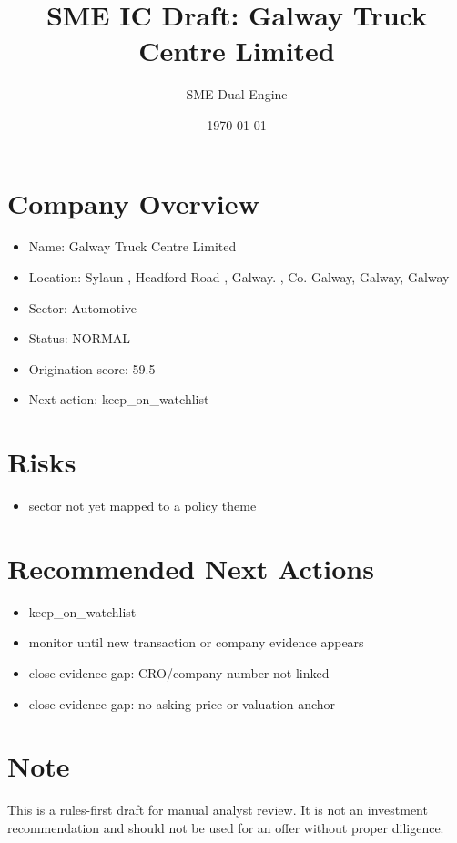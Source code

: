 \documentclass[11pt,a4paper]{article}
\title{SME IC Draft: Galway Truck Centre Limited}
\author{SME Dual Engine}
\date{\today}
\begin{document}
\maketitle
\section*{Company Overview}
\begin{itemize}[leftmargin=1.4em]
\item Name: Galway Truck Centre Limited
\item Location: Sylaun , Headford Road , Galway. , Co. Galway, Galway, Galway
\item Sector: Automotive
\item Status: NORMAL
\item Origination score: 59.5
\item Next action: keep\_on\_watchlist
\end{itemize}
\section*{Risks}
\begin{itemize}[leftmargin=1.4em]
\item sector not yet mapped to a policy theme
\end{itemize}
\section*{Recommended Next Actions}
\begin{itemize}[leftmargin=1.4em]
\item keep\_on\_watchlist
\item monitor until new transaction or company evidence appears
\item close evidence gap: CRO/company number not linked
\item close evidence gap: no asking price or valuation anchor
\end{itemize}
\section*{Note}
This is a rules-first draft for manual analyst review. It is not an investment
recommendation and should not be used for an offer without proper diligence.
\end{document}
